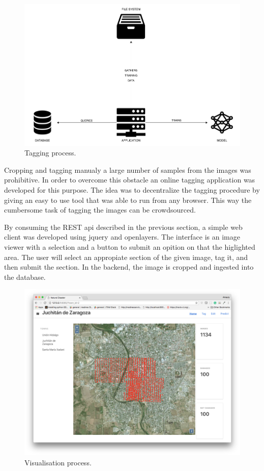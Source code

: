 \begin{figure}[h]
  \centering
  \includegraphics[width=1\textwidth]{images/train-diagram.png}
  \caption{Tagging process.}
  \label{fig:train}
\end{figure}

Cropping and tagging manualy a large number of samples from the images was prohibitive. In order to overcome this obstacle an online tagging application was developed for this purpose. The idea was to decentralize the tagging procedure by giving an easy to use tool that was able to run from any browser. This way the cumbersome task of tagging the images can be crowdsourced.

By consuming the REST api described in the previous section, a simple web client was developed using jquery and openlayers. The interface is an image viewer with a selection and a button to submit an opition on that the higlighted area. The user will select an appropiate section of the given image, tag it, and then submit the section. In the backend, the image is cropped and ingested into the database.





\begin{figure}[h]
  \centering
  \includegraphics[width=1\textwidth]{images/small-app-juchitan.png}
  \caption{Visualisation process.}
  \label{fig:visualise}
\end{figure}

